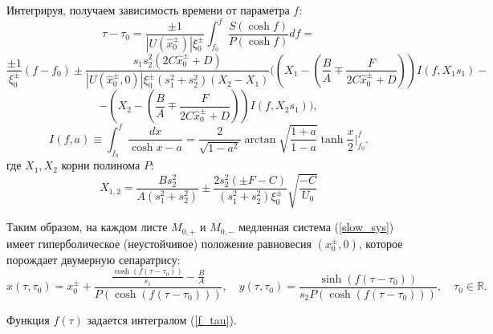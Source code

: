 Интегрируя, получаем зависимость времени от параметра $f$:
\begin{equation}
\label{f_tau}
\tau - \tau_0 = \frac{\pm 1}{|U(\hat x_0^\pm)| \xi_0^\pm} \int_{f_0}^f \frac{S(\cosh f)}{P(\cosh f)} df = 
\end{equation}
$$
\frac{\pm 1}{\xi_0^\pm}(f-f_0) \pm \frac{s_1 s_2^2 (2C \hat x_0^\pm +  D)}{|U(\hat x_0^\pm,0)| \xi_0^\pm (s_1^2+s_2^2)(X_2-X_1)} \Bigg( \left( X_1 - \left(\frac BA \mp \frac{F}{2C \hat x_0^\pm +  D} \right) \right) I(f, X_1 s_1) -
$$
$$
 - \left( X_2 - \left( \frac BA \mp \frac{F}{2C \hat x_0^\pm +  D} \right) \right) I(f, X_2 s_1) \Bigg),
$$
$$I(f,a) \equiv \int_{f_0}^f \frac{dx}{\cosh x - a} = \frac{2}{\sqrt{1-a^2}} \arctan \sqrt{\frac{1+a}{1-a}} \tanh \frac{x}{2}\Big|_{f_0}^f.$$
где $X_1, X_2$ корни полинома $P$:
$$X_{1,2} = \frac{B s_2^2}{A(s_1^2+s_2^2)} \pm \frac{2 s_2^2 (\pm F - C)}{(s_1^2+s_2^2) \xi_0^\pm} \sqrt{\frac{-C}{U_0}}$$

Таким образом, на каждом листе $M_{0,+}$ и $M_{0,-}$ медленная система (\ref{slow_sys}) имеет гиперболическое (неустойчивое) положение равновесия $(x_0^\pm,0)$, которое порождает двумерную сепаратрису:
\[
x(\tau,\tau_0) = x_0^\pm + \frac{\frac{\cosh(f(\tau-\tau_0))}{s_1} - \frac{B}{A}}{P(\cosh(f(\tau-\tau_0)))}, \quad
y(\tau,\tau_0) = \frac{\sinh(f(\tau-\tau_0))}{s_2 P(\cosh(f(\tau-\tau_0)))}, \quad \tau_0 \in \mathbb{R}.
\]

Функция $f(\tau)$ задается интегралом (\ref{f_tau}).
